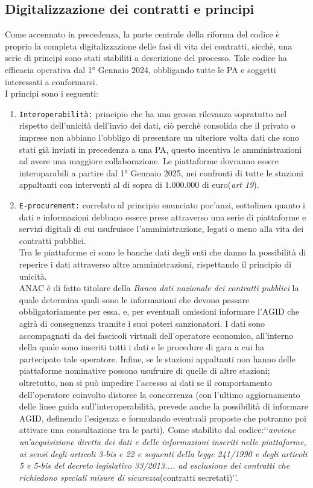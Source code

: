 \documentclass{article}
\begin{document}
\newpage\subsection{Digitalizzazione dei contratti e principi}
\begin{justify}
    Come accennato in precedenza, la parte centrale della riforma del codice è proprio la completa digitalizzazione delle fasi di vita dei contratti, sicchè, una serie di principi sono stati stabiliti a descrizione del processo.
    Tale codice ha efficacia operativa dal 1° Gennaio 2024, obbligando tutte le PA e soggetti interessati a conformarsi.\\
    I principi sono i seguenti:
    \begin{enumerate}
        \item \texttt{Interoperabilità:} principio che ha una grossa rilevanza sopratutto nel rispetto dell'unicità dell'invio dei dati, ciò perchè consolida che il privato o imprese non abbiano l'obbligo di presentare un ulteriore volta dati che sono stati già inviati in precedenza a una PA, questo incentiva le amministrazioni ad avere una maggiore collaborazione. Le piattaforme dovranno essere interoparabili a partire dal 1° Gennaio 2025, nei confronti di tutte le stazioni appaltanti con interventi al di sopra di $1.000.000$ di euro(\textit{art 19}).
        \item \texttt{E-procurement:} correlato al principio enunciato poc'anzi, sottolinea quanto i dati e informazioni debbano essere prese attraverso una serie di piattaforme e servizi digitali di cui usufruisce l'amministrazione, legati o meno alla vita dei contratti pubblici.\\ Tra le piattaforme ci sono le banche dati degli enti che danno la possibilità di reperire i dati attraverso altre amministrazioni, rispettando il principio di unicità.\\
        ANAC è di fatto titolare della \textit{Banca dati nazionale dei contratti pubblici} la quale determina quali sono le informazioni che devono passare obbligatoriamente per essa, e, per eventuali omissioni informare l'AGID che agirà di conseguenza tramite i suoi poteri sanzionatori. I dati sono accompagnati da dei fascicoli virtuali dell'operatore economico, all'interno della quale sono inseriti tutti i dati e le procedure di gara a cui ha partecipato tale operatore. Infine, se le stazioni appaltanti non hanno delle piattaforme nominative possono usufruire di quelle di altre stazioni; oltretutto, non si può impedire l'accesso ai dati se il comportamento dell'operatore coinvolto distorce la concorrenza (con l'ultimo aggiornamento delle linee guida sull'interoperabilità, prevede anche la possibilità di informare AGID, definendo l'esigenza e formulando eventuali proposte che potranno poi attivare una consultazione tra le parti\citep{AGID_linee_2023}). Come stabilito dal codice:‘‘\textit{avviene un'acquisizione diretta dei dati e delle informazioni inseriti nelle piattaforme, ai sensi degli articoli 3-bis e 22 e seguenti della legge 241/1990 e degli articoli 5 e 5-bis del decreto legislativo 33/2013.... ad esclusione dei contratti che richiedono speciali misure di sicurezza}(contratti secretati)’’.\\

\end{enumerate}
\end{justify}
\end{document}
